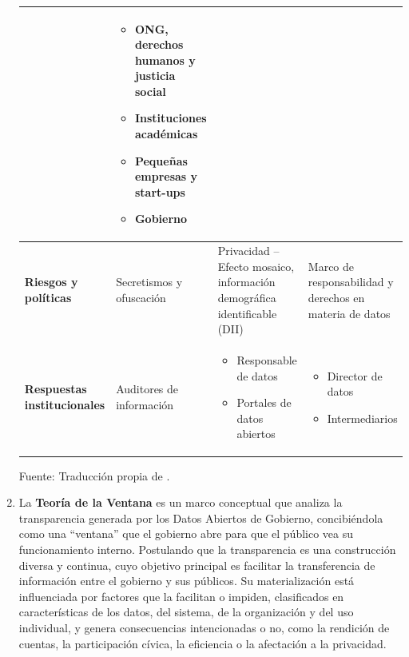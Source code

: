 \begin{enumerate}
\begin{table}[ht]
{\begin{tabular}{|p{3cm}|p{4cm}|p{4cm}|p{5cm}|}
				& 
				\begin{itemize}
					\item ONG, derechos humanos y justicia social
					\item Instituciones académicas
					\item Pequeñas empresas y start-ups
					\item Gobierno
				\end{itemize} \\
				\hline
				\textbf{Riesgos y políticas} & Secretismos y ofuscación & Privacidad -- Efecto mosaico, información demográfica identificable (DII) & Marco de responsabilidad y derechos en materia de datos \\
				\hline
				\textbf{Respuestas institucionales} & Auditores de información & 
				\begin{itemize}
					\item Responsable de datos
					\item Portales de datos abiertos
				\end{itemize}
				& 
				\begin{itemize}
					\item Director de datos
					\item Intermediarios
				\end{itemize} \\
				\hline
			\end{tabular}
		}
		\vspace{0.5em}
		
		\footnotesize Fuente: Traducción propia de \cite{verhulst2020}. \\
	\end{table}

	\item La \textbf{Teoría de la Ventana} \label{def6} \citep{Matheus03052020} es un marco conceptual que analiza la transparencia generada por los Datos Abiertos de Gobierno, concibiéndola como una ``ventana'' que el gobierno abre para que el público vea su funcionamiento interno. Postulando que la transparencia es una construcción diversa y continua, cuyo objetivo principal es facilitar la transferencia de información entre el gobierno y sus públicos. Su materialización está influenciada por factores que la facilitan o impiden, clasificados en características de los datos, del sistema, de la organización y del uso individual, y genera consecuencias intencionadas o no, como la rendición de cuentas, la participación cívica, la eficiencia o la afectación a la privacidad. \\
	

\end{enumerate}
